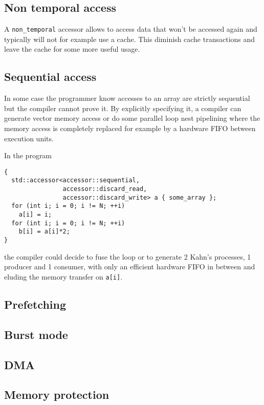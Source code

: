 \documentclass{article}
\begin{document}
\subsection{Non temporal access}
\label{sec:non-temporal-access}

A \lstinline|non_temporal| accessor allows to access data that won't
be accessed again and typically will not for example use a cache. This
diminish cache transactions and leave the cache for some more useful
usage.


\subsection{Sequential access}
\label{sec:sequential-access}

In some case the programmer know accesses to an array are strictly
sequential but the compiler cannot prove it. By explicitly specifying
it, a compiler can generate vector memory access or do some parallel
loop nest pipelining where the memory access is completely replaced
for example by a hardware FIFO between execution units.

In the program
\begin{lstlisting}
{
  std::accessor<accessor::sequential,
                accessor::discard_read,
                accessor::discard_write> a { some_array };
  for (int i; i = 0; i != N; ++i)
    a[i] = i;
  for (int i; i = 0; i != N; ++i)
    b[i] = a[i]*2;
}
\end{lstlisting}
the compiler could decide to fuse the loop or to generate 2 Kahn's
processes, 1 producer and 1 consumer, with only an efficient hardware
FIFO in between and eluding the memory transfer on \lstinline|a[i]|.


\subsection{Prefetching}
\label{sec:prefetching}

\subsection{Burst mode}
\label{sec:burst-mode}

\subsection{DMA}
\label{sec:dma}

\subsection{Memory protection}
\label{sec:memory-protection}
\end{document}
